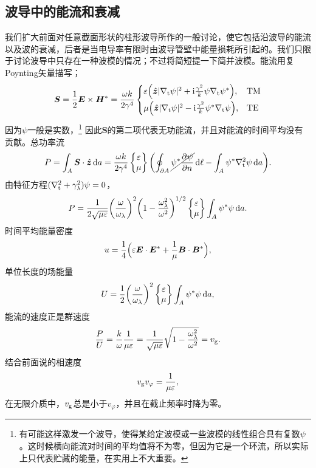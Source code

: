\subsection{波导中的能流和衰减}
我们扩大前面对任意截面形状的柱形波导所作的一般讨论，使它包括沿波导的能流以及波的衰减，后者是当电导率有限时由波导管壁中能量损耗所引起的。我们只限于讨论波导中只存在一种波模的情况；不过将简短提一下简并波模。能流用复Poynting矢量描写；
\begin{equation}
    \bm S=\frac12\bm E\times\bm H^\ast=\frac{\omega k}{2\gamma^4}
    \begin{cases}
        \varepsilon\Bigl(\mathop{}\!\hat{\bm{z}}|\nabla_\text t\psi|^2+\mathrm{i}\frac{\gamma^2}k\psi\nabla_\text t\psi^\ast\Bigr),&\text{TM}\\[1ex]
        \mu\Bigl(\mathop{}\!\hat{\bm{z}}|\nabla_\text t\psi|^2-\mathrm{i}\frac{\gamma^2}k\psi^\ast\nabla_\text t\psi\Bigr),&\text{TE}
    \end{cases}
\end{equation}
因为$\psi$一般是实数，\footnote{有可能这样激发一个波导，使得某给定波模或一些波模的线性组合具有复数$\psi$。这时候横向能流对时间的平均值将不为零，但因为它是一个环流，所以实际上只代表贮藏的能量，在实用上不大重要。}
因此$\bm S$的第二项代表无功能流，并且对能流的时间平均没有贡献。总功率流
\[
    P=\int_A\bm S\cdot\mathop{}\!\hat{\bm{z}}\mathop{}\!\mathrm{d} a=\frac{\omega k}{2\gamma^4}
    \begin{Bmatrix}
        \varepsilon\\\mu
    \end{Bmatrix}
    \biggl(\oint_{\partial A}\cancel{\psi^\ast\frac{\partial^{{}}\psi}{\partial{n}^{{}}}}\mathop{}\!\mathrm{d}\ell-\int_A\psi^\ast\nabla_\text t^2\psi\mathop{}\!\mathrm{d} a\biggr).
\]
由特征方程$(\nabla_\text t^2+\gamma_\lambda^2)\psi=0$，
\[
    P=\frac1{2\sqrt{\mu\varepsilon}}\biggl(\frac\omega{\omega_\lambda}\biggr)^2\biggl(1-\frac{\omega_\lambda^2}{\omega^2}\biggr)^{1/2}
    \begin{Bmatrix}
        \varepsilon\\\mu
    \end{Bmatrix}
    \int_A\psi^\ast\psi\mathop{}\!\mathrm{d} a.
\]
时间平均能量密度
\[
    u=\frac14\Bigl(\varepsilon\bm E\cdot\bm E^\ast+\frac1\mu\bm B\cdot\bm B^\ast\Bigr),
\]
单位长度的场能量
\[
    U=\frac12\biggl(\frac\omega{\omega_\lambda}\biggr)^2
    \begin{Bmatrix}
        \varepsilon\\\mu
    \end{Bmatrix}
    \int_A\psi^\ast\psi\mathop{}\!\mathrm{d} a,
\]
能流的速度正是群速度
\[
    \frac PU=\frac k\omega\frac1{\mu\varepsilon}=\frac1{\sqrt{\mu\varepsilon}}\sqrt{1-\frac{\omega_\lambda^2}{\omega^2}}=v_\text g.
\]
结合前面说的相速度
\begin{equation}
    v_\text gv_\varphi=\frac1{\mu\varepsilon},
\end{equation}
在无限介质中，$v_\text g$总是小于$v_\varphi$，并且在截止频率时降为零。

